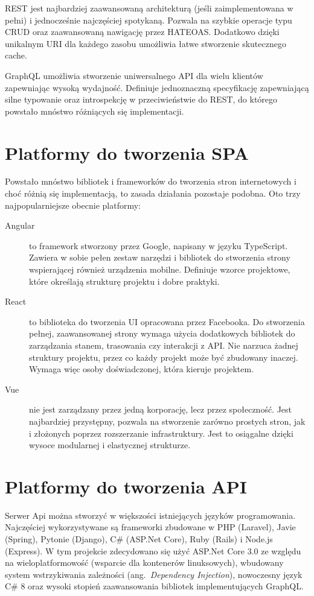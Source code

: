 	REST jest najbardziej zaawansowaną architekturą (jeśli zaimplementowana w pełni) i jednocześnie najczęściej spotykaną.
	Pozwala na szybkie operacje typu CRUD oraz zaawansowaną nawigację przez HATEOAS.
	Dodatkowo dzięki unikalnym URI dla każdego zasobu umożliwia łatwe stworzenie skutecznego cache.

	GraphQL umożliwia stworzenie uniwersalnego API dla wielu klientów zapewniając wysoką wydajność.
	Definiuje jednoznaczną specyfikację zapewniającą silne typowanie oraz introspekcję w przeciwieństwie do REST,
	do którego powstało mnóstwo różniących się implementacji.

\section{Platformy do tworzenia SPA}
	Powstało mnóstwo bibliotek i frameworków do tworzenia stron internetowych i choć różnią się implementacją, to zasada działania pozostaje podobna.
	Oto trzy najpopularniejsze obecnie platformy:
	\begin{description}
		\item[Angular] to framework stworzony przez Google, napisany w języku TypeScript.
			Zawiera w sobie pełen zestaw narzędzi i bibliotek do stworzenia strony wspierającej również urządzenia mobilne.
			Definiuje wzorce projektowe, które określają strukturę projektu i dobre praktyki.

		\item[React] to biblioteka do tworzenia UI opracowana przez Facebooka.
			Do stworzenia pełnej, zaawansowanej strony wymaga użycia dodatkowych bibliotek do zarządzania stanem, trasowania czy interakcji z API.
			Nie narzuca żadnej struktury projektu, przez co każdy projekt może być zbudowany inaczej.
			Wymaga więc osoby doświadczonej, która kieruje projektem.

		\item[Vue] nie jest zarządzany przez jedną korporację, lecz przez społeczność.
			Jest najbardziej przystępny, pozwala na stworzenie zarówno prostych stron, jak i złożonych poprzez rozszerzanie infrastruktury.
			Jest to osiągalne dzięki wysoce modularnej i elastycznej strukturze.
	\end{description}

\section{Platformy do tworzenia API}
	Serwer Api można stworzyć w większości istniejących języków programowania.
	Najczęściej wykorzystywane są frameworki zbudowane w PHP (Laravel), Javie (Spring), Pytonie (Django), C\# (ASP.Net Core), Ruby (Rails) i Node.js (Express).
	W tym projekcie zdecydowano się użyć ASP.Net Core 3.0 ze względu na wieloplatformowość (wsparcie dla kontenerów linuksowych),
	wbudowany system wstrzykiwania zależności (ang.\ \emph{Dependency Injection}), nowoczesny język C\# 8 oraz wysoki stopień zaawansowania bibliotek implementujących GraphQL.
